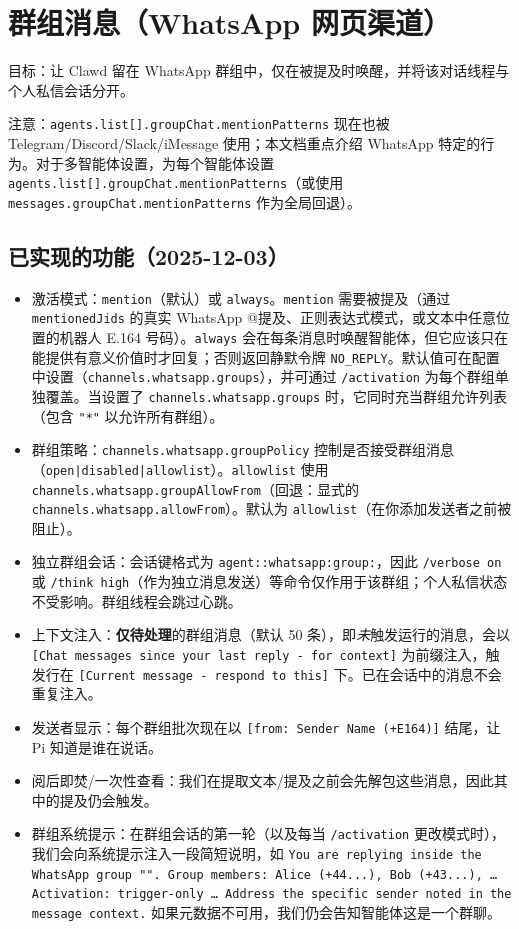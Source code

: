 \clearpage

\section{群组消息（WhatsApp 网页渠道）}


目标：让 Clawd 留在 WhatsApp 群组中，仅在被提及时唤醒，并将该对话线程与个人私信会话分开。

注意：\texttt{agents.list[].groupChat.mentionPatterns} 现在也被 Telegram/Discord/Slack/iMessage 使用；本文档重点介绍 WhatsApp 特定的行为。对于多智能体设置，为每个智能体设置 \texttt{agents.list[].groupChat.mentionPatterns}（或使用 \texttt{messages.groupChat.mentionPatterns} 作为全局回退）。

\subsection{已实现的功能（2025-12-03）}


\begin{itemize}
  \item 激活模式：\texttt{mention}（默认）或 \texttt{always}。\texttt{mention} 需要被提及（通过 \texttt{mentionedJids} 的真实 WhatsApp @提及、正则表达式模式，或文本中任意位置的机器人 E.164 号码）。\texttt{always} 会在每条消息时唤醒智能体，但它应该只在能提供有意义价值时才回复；否则返回静默令牌 \texttt{NO\_REPLY}。默认值可在配置中设置（\texttt{channels.whatsapp.groups}），并可通过 \texttt{/activation} 为每个群组单独覆盖。当设置了 \texttt{channels.whatsapp.groups} 时，它同时充当群组允许列表（包含 \texttt{"*"} 以允许所有群组）。
  \item 群组策略：\texttt{channels.whatsapp.groupPolicy} 控制是否接受群组消息（\texttt{open|disabled|allowlist}）。\texttt{allowlist} 使用 \texttt{channels.whatsapp.groupAllowFrom}（回退：显式的 \texttt{channels.whatsapp.allowFrom}）。默认为 \texttt{allowlist}（在你添加发送者之前被阻止）。
  \item 独立群组会话：会话键格式为 \texttt{agent::whatsapp:group:}，因此 \texttt{/verbose on} 或 \texttt{/think high}（作为独立消息发送）等命令仅作用于该群组；个人私信状态不受影响。群组线程会跳过心跳。
  \item 上下文注入：\textbf{仅待处理}的群组消息（默认 50 条），即\textit{未}触发运行的消息，会以 \texttt{[Chat messages since your last reply - for context]} 为前缀注入，触发行在 \texttt{[Current message - respond to this]} 下。已在会话中的消息不会重复注入。
  \item 发送者显示：每个群组批次现在以 \texttt{[from: Sender Name (+E164)]} 结尾，让 Pi 知道是谁在说话。
  \item 阅后即焚/一次性查看：我们在提取文本/提及之前会先解包这些消息，因此其中的提及仍会触发。
  \item 群组系统提示：在群组会话的第一轮（以及每当 \texttt{/activation} 更改模式时），我们会向系统提示注入一段简短说明，如 \texttt{You are replying inside the WhatsApp group "". Group members: Alice (+44...), Bob (+43...), … Activation: trigger-only … Address the specific sender noted in the message context.} 如果元数据不可用，我们仍会告知智能体这是一个群聊。
\end{itemize}


